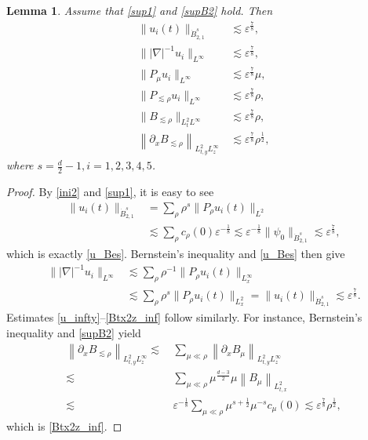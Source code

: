 \documentclass[11pt,letterpaper,reqno]{amsart}
\numberwithin{equation}{section}
\newtheorem{lemma}[theorem]{Lemma}
\theoremstyle{definition}
\theoremstyle{remark}
\begin{document}
\begin{lemma} \label{lemma1.3}
Assume that  \eqref{sup1} and \eqref{supB2} hold. Then
	\begin{align}
		\| u_i(t) \|_{\dot{B}^s_{2,1}}&\,  \lesssim \varepsilon^{\frac 78} \label{u_Bes},\\
		\||\nabla|^{-1}u_i\|_{L^\infty} 	&\, \lesssim \varepsilon^{\frac 78},  \label{h_infty}\\
      	\| P_\mu u_i\|_{L^\infty} 	&\, \lesssim \varepsilon^{\frac 78} \mu,  \label{u_infty}  \\
   \| P_{\lesssim\rho } u_i\|_{L^\infty} 	&\, \lesssim \varepsilon^{\frac 78} \rho,  \label{u_infty_rho}       \\
  \| B_{\lesssim\rho} \|_{L^2_t L^\infty} &\,\lesssim  \varepsilon^{\frac 78} \rho, \label{B_infty}\\
  \left\| \partial_x B_{\lesssim \rho  }\right\|_{L^2_{t,y }L^\infty_z }  &\, \lesssim  \varepsilon^{\frac 78} \rho^{\frac 12}, \label{Btx2z_inf}
	\end{align}
	where  $ s=\frac {d}{2}-1, i=1,2,3,4,5 $.
\end{lemma}
\begin{proof} By \eqref{ini2} and \eqref{sup1}, it is easy to see
	\begin{align*}
		\| u_i(t) \|_{\dot{B}^s_{2,1}}&= \sum_{\rho} \rho^{ s} \|P_\rho u_i(t) \|_{L^2}\nonumber\\
		&\lesssim \sum_{\rho} c_\rho (0) \varepsilon^{-\frac 18} \lesssim \varepsilon^{-\frac 18 } \| \psi_0\|_{\dot{B}^s_{2,1}} \lesssim \varepsilon^{\frac 78},
	\end{align*}
    which is exactly \eqref{u_Bes}. Bernstein's inequality and \eqref{u_Bes} then give
	\begin{align*}
		\||\nabla|^{-1}u_i\|_{L^\infty} &\lesssim  \sum_{ \rho} \rho^{-1}  \|P_\rho u_i(t) \|_{L_x^\infty}\\
		&\lesssim\sum_{\rho} \rho^{ s} \|P_\rho u_i(t) \|_{L_x^2}=\| u_i(t) \|_{\dot{B}^s_{2,1}}\lesssim \varepsilon^{\frac 78}.
	\end{align*}
Estimates \eqref{u_infty}--\eqref{Btx2z_inf} follow similarly. For instance, Bernstein's inequality and \eqref{supB2} yield
\begin{align*}
  \left\| \partial_x B_{\lesssim \rho  }\right\|_{L^2_{t,y }L^\infty_z } \lesssim&\, \sum_{\mu \ll \rho }  \left\| \partial_x B_{\mu }\right\|_{L^2_{t,y }L^\infty_z }  \nonumber \\
	\lesssim &\,  \sum_{\mu \ll \rho }   \mu^{\frac{d-3}{2}} \mu\left\|   B_{\mu }\right\|_{L^2_{t,x } }   \nonumber\\
	\lesssim &\,  \varepsilon^{-\frac 18}  \sum_{\mu \ll \rho } \mu^{s+\frac 12} \mu^{-s} c_\mu (0)  
 \lesssim    \varepsilon^{\frac 78} \rho^{\frac 12}, 
\end{align*}
which is \eqref{Btx2z_inf}.
\end{proof}	
\end{document}
